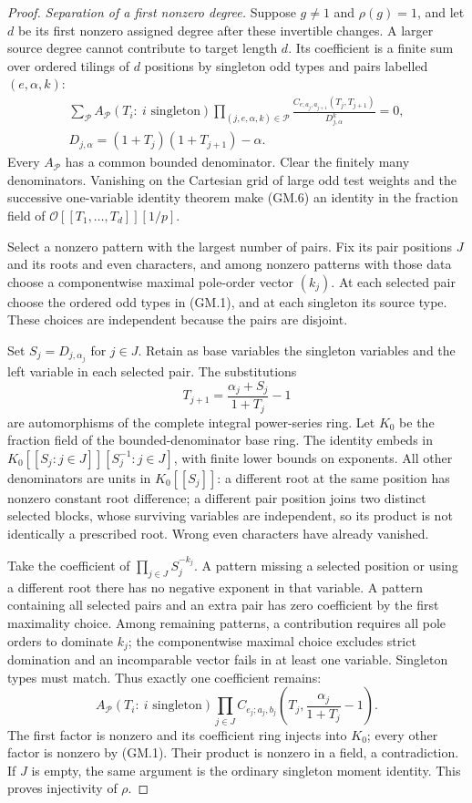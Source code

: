 \documentclass[11pt,a4paper]{article}
\theoremstyle{definition}
\begin{document}
\begin{proof}
\emph{Separation of a first nonzero degree.}
Suppose $g\ne1$ and $\rho(g)=1$, and let $d$ be its first nonzero
assigned degree after these invertible changes. A larger source
degree cannot contribute to target length $d$. Its coefficient is
a finite sum over ordered tilings of $d$ positions by singleton
odd types and pairs labelled $(e,\alpha,k)$:
\[
 \begin{gathered}
 \sum_{\mathcal P}A_{\mathcal P}(T_i:\ i\text{ singleton})
       \prod_{(j,e,\alpha,k)\in\mathcal P}
       \frac{C_{e;a_j,a_{j+1}}(T_j,T_{j+1})}
            {D_{j,\alpha}^{k}}=0,\\
 D_{j,\alpha}=(1+T_j)(1+T_{j+1})-\alpha.
 \end{gathered}                                            \tag{GM.6}
\]
Every $A_{\mathcal P}$ has a common bounded denominator. Clear
the finitely many denominators. Vanishing on the Cartesian grid
of large odd test weights and the successive one-variable identity
theorem make (GM.6) an identity in the fraction field of
$\mathcal O[[T_1,\ldots,T_d]][1/p]$.

Select a nonzero pattern with the largest number of pairs. Fix its
pair positions $J$ and its roots and even characters, and among
nonzero patterns with those data choose a componentwise maximal
pole-order vector $(k_j)$. At each selected pair choose the ordered
odd types in (GM.1), and at each singleton its source type. These
choices are independent because the pairs are disjoint.

Set $S_j=D_{j,\alpha_j}$ for $j\in J$. Retain as base variables
the singleton variables and the left variable in each selected pair.
The substitutions
\[
 T_{j+1}=\frac{\alpha_j+S_j}{1+T_j}-1
\]
are automorphisms of the complete integral power-series ring.
Let $K_0$ be the fraction field of the bounded-denominator base
ring. The identity embeds in $K_0[[S_j:j\in J]][S_j^{-1}:j\in J]$,
with finite lower bounds on exponents. All other denominators are
units in $K_0[[S_j]]$: a different root at the same position has
nonzero constant root difference; a different pair position joins
two distinct selected blocks, whose surviving variables are
independent, so its product is not identically a prescribed root.
Wrong even characters have already vanished.

Take the coefficient of $\prod_{j\in J}S_j^{-k_j}$.
A pattern missing a selected position or using a different root
there has no negative exponent in that variable. A pattern
containing all selected pairs and an extra pair has zero coefficient
by the first maximality choice. Among remaining patterns, a
contribution requires all pole orders to dominate $k_j$; the
componentwise maximal choice excludes strict domination and an
incomparable vector fails in at least one variable. Singleton types
must match. Thus exactly one coefficient remains:
\[
 A_{\mathcal P}(T_i:\ i\text{ singleton})
 \prod_{j\in J}
 C_{e_j;a_j,b_j}\left(T_j,\frac{\alpha_j}{1+T_j}-1\right).
\]
The first factor is nonzero and its coefficient ring injects into
$K_0$; every other factor is nonzero by (GM.1). Their product is
nonzero in a field, a contradiction. If $J$ is empty, the same
argument is the ordinary singleton moment identity. This proves
injectivity of $\rho$.
\end{proof}
\end{document}
